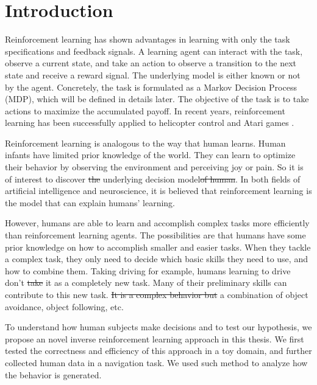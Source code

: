 \documentclass[12pt]{report}	%
\theoremstyle{definition}
\theoremstyle{remark}
\providecommand{\DIFadd}[1]{{\protect\color{blue}\uwave{#1}}} %
\providecommand{\DIFdel}[1]{{\protect\color{red}\sout{#1}}}                      %
\providecommand{\DIFaddbegin}{} %
\providecommand{\DIFaddend}{} %
\providecommand{\DIFdelbegin}{} %
\providecommand{\DIFdelend}{} %
\begin{document}
\chapter{Introduction}
Reinforcement learning has shown advantages in learning with only the task
specifications and feedback signals. A learning agent can interact with the
task, observe a current state, and take an action to observe a
transition to the next state and receive a reward signal. The underlying model is either
known or not by the agent. Concretely, the task is formulated as a
Markov Decision Process (MDP), which will be defined in details later.
The objective of the task is to take actions to maximize the accumulated payoff.
In recent years, reinforcement learning has been successfully applied to
helicopter control \cite{ng2006autonomous} and Atari games \cite{mnih2013playing}.

Reinforcement learning is analogous to the way that human learns. Human infants
have limited prior knowledge of the world. They can learn to optimize
their behavior by observing the environment and perceiving joy or pain. So it is
of interest to discover \DIFdelbegin \DIFdel{the }\DIFdelend \DIFaddbegin \DIFadd{their }\DIFaddend underlying decision model\DIFdelbegin \DIFdel{of human}\DIFdelend . In both fields
of artificial intelligence and neuroscience, it is believed that reinforcement
learning is the model that can explain humans' learning.

However, humans are able to learn and accomplish complex tasks more efficiently than
reinforcement learning agents. The possibilities are that humans have some prior
knowledge on how to accomplish smaller and easier tasks. When they tackle a
complex task, they only need to decide which basic skills they need to use, and
how to combine them. Taking driving for example, humans learning to drive don't
\DIFdelbegin \DIFdel{take }\DIFdelend \DIFaddbegin \DIFadd{model }\DIFaddend it as a completely new task. Many of their preliminary skills can
contribute to this new task. \DIFdelbegin \DIFdel{It is a complex behavior but }\DIFdelend \DIFaddbegin \DIFadd{Such complex behavior can be }\DIFaddend a combination of
object avoidance, object following, etc.

To understand how human subjects make decisions and to test our hypothesis, we
propose an novel inverse reinforcement learning approach in this thesis.
We first tested the correctness and efficiency of this approach in a toy domain,
and further collected human data in a navigation task. We used such method
to analyze how the behavior is generated.
\end{document}

